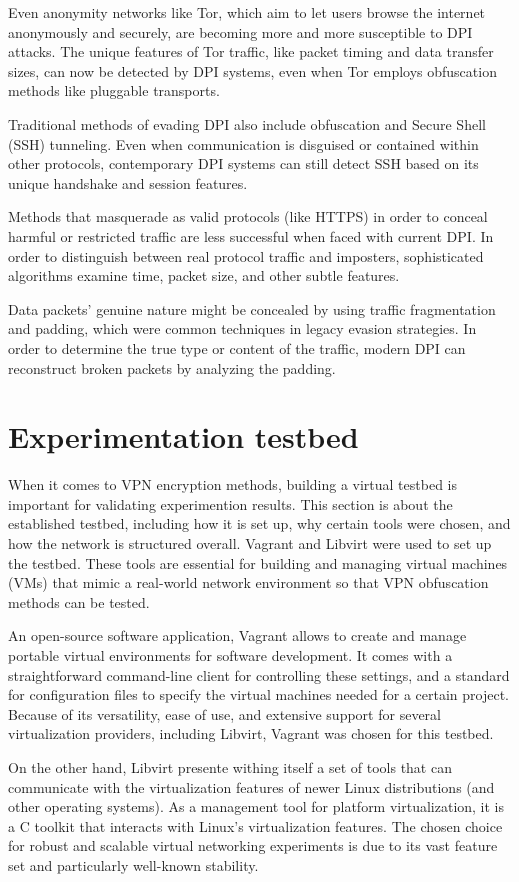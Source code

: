 \documentclass[12pt, fleqn, a4paper]{article}
\begin{document}
Even anonymity networks like Tor, which aim to let users browse the internet anonymously and securely, are becoming more and more susceptible to DPI attacks. The unique features of Tor traffic, like packet timing and data transfer sizes, can now be detected by DPI systems, even when Tor employs obfuscation methods like pluggable transports.

Traditional methods of evading DPI also include obfuscation and Secure Shell (SSH) tunneling. Even when communication is disguised or contained within other protocols, contemporary DPI systems can still detect SSH based on its unique handshake and session features. \citep{sshtunneling}

Methods that masquerade as valid protocols (like HTTPS) in order to conceal harmful or restricted traffic are less successful when faced with current DPI. In order to distinguish between real protocol traffic and imposters, sophisticated algorithms examine time, packet size, and other subtle features. \citep{dpisslinspect}

Data packets' genuine nature might be concealed by using traffic fragmentation and padding, which were common techniques in legacy evasion strategies. In order to determine the true type or content of the traffic, modern DPI can reconstruct broken packets by analyzing the padding.
\section{Experimentation testbed}
When it comes to VPN encryption methods, building a virtual testbed is important for validating experimention results. This section is about the established testbed, including how it is set up, why certain tools were chosen, and how the network is structured overall. Vagrant and Libvirt were used to set up the testbed. These tools are essential for building and managing virtual machines (VMs) that mimic a real-world network environment so that VPN obfuscation methods can be tested.

An open-source software application, Vagrant allows to create and manage portable virtual environments for software development. It comes with a straightforward command-line client for controlling these settings, and a standard for configuration files to specify the virtual machines needed for a certain project. Because of its versatility, ease of use, and extensive support for several virtualization providers, including Libvirt, Vagrant was chosen for this testbed.

On the other hand, Libvirt presente withing itself a set of tools that can communicate with the virtualization features of newer Linux distributions (and other operating systems). As a management tool for platform virtualization, it is a C toolkit that interacts with Linux's virtualization features. The chosen choice for robust and scalable virtual networking experiments is due to its vast feature set and particularly well-known stability.
\end{document}
